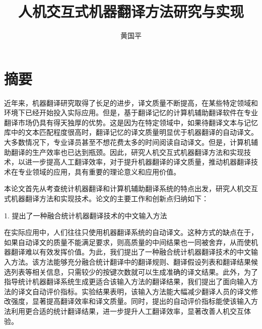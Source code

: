   \confidential{} %
  \title[人机交互式机器翻译方法研究与实现]{人机交互式机器翻译方法研究与实现}
  \author{黄国平} %
\maketitle
\makeenglishtitle
\makedeclaration
\chapter{摘要}%
近年来，机器翻译研究取得了长足的进步，译文质量不断提高，在某些特定领域和环境下已经开始投入实际应用。但是，基于翻译记忆的计算机辅助翻译软件在专业翻译市场仍具有得天独厚的优势。这是因为在特定领域中，如果待翻译文本与记忆库中的文本匹配程度很高时，翻译记忆的译文质量明显优于机器翻译的自动译文。大多数情况下，专业译员甚至不想花费太多的时间阅读自动译文。但是，计算机辅助翻译的生产效率也已达到瓶颈。因此，研究人机交互式机器翻译方法和实现技术，以进一步提高人工翻译效率，对于提升机器翻译的译文质量，推动机器翻译技术在专业领域的应用，具有重要的理论意义和应用价值。

本论文首先从考查统计机器翻译和计算机辅助翻译系统的特点出发，研究人机交互式机器翻译方法和实现技术。论文的主要工作和创新点归纳如下：

1. 提出了一种融合统计机器翻译技术的中文输入方法

在实际应用中，人们往往只使用机器翻译系统的自动译文。这种方式的缺点在于，如果自动译文的质量不能满足要求，则高质量的中间结果也一同被舍弃，从而使机器翻译难以有效发挥价值。为此，我们提出了一种融合统计机器翻译技术的中文输入方法。该方法能够充分融合统计翻译中的翻译规则、翻译假设列表和翻译结果候选列表等相关信息，只需较少的按键次数就可以生成准确的译文结果。此外，为了指导统计机器翻译系统生成更适合该输入方法的翻译结果，我们提出了面向输入方法的译文自动评价指标。实验结果表明，该输入方法能大幅减少翻译人员的译文修改强度，显著提高翻译效率和译文质量。同时，提出的自动评价指标能使该输入方法利用更合适的统计翻译结果，进一步提升人工翻译效率，显著改善人机交互体验。

